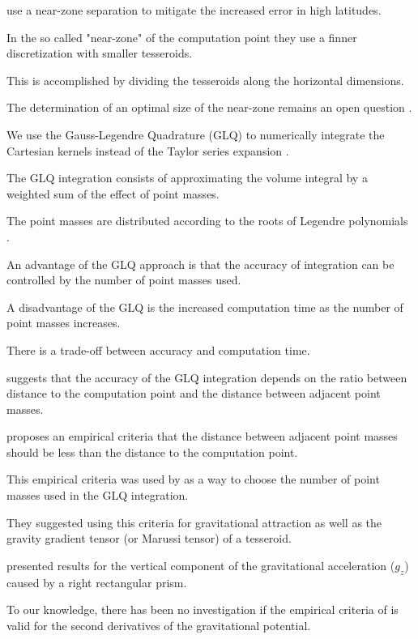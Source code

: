 \documentclass[paper,twocolumn]{geophysics}
\begin{document}
\citet{Grombein2013} use a near-zone separation to mitigate the increased error
in high latitudes.

In the so called "near-zone" of the computation point they use a finner
discretization with smaller tesseroids.

This is accomplished by dividing the tesseroids along the horizontal
dimensions.

The determination of an optimal size of the near-zone remains an open question
\citep{Grombein2013}.

We use the Gauss-Legendre Quadrature (GLQ) to numerically integrate the Cartesian
kernels instead of the Taylor series expansion \citep{Asgharzadeh2007}.

The GLQ integration consists of approximating the volume integral by a weighted sum of
the effect of point masses.

The point masses are distributed according to the roots of Legendre polynomials
\citep{Hildebrand1987}.

An advantage of the GLQ approach is that the accuracy of integration can be
controlled by the number of point masses used.

A disadvantage of the GLQ is the increased computation time as the number of
point masses increases.

There is a trade-off between accuracy and computation time.

\citet{Ku1977} suggests that the accuracy of the GLQ integration depends on
the ratio between distance to the computation point and the distance between
adjacent point masses.

\citet{Ku1977} proposes an empirical criteria that the distance between adjacent
point masses should be less than the distance to the computation point.

This empirical criteria was used by \citet{Asgharzadeh2007} as a way to
choose the number of point masses used in the GLQ integration.

They suggested using this criteria for gravitational attraction as well as
the gravity gradient tensor (or Marussi tensor) of a tesseroid.

\citet{Ku1977} presented results for the vertical component of the
gravitational acceleration ($g_z$) caused by a right rectangular prism.

To our knowledge, there has been no investigation if the empirical criteria of
\citet{Ku1977} is valid for the second derivatives of the
gravitational potential.
\end{document}

